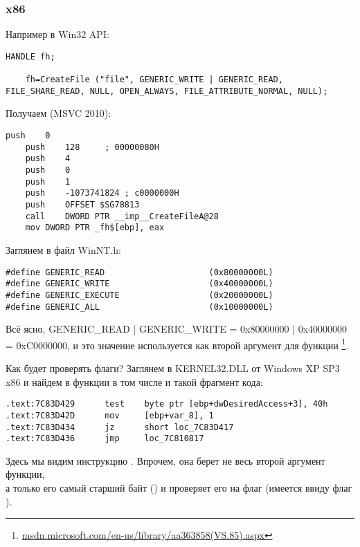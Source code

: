 \subsubsection{x86}

Например в Win32 API:

\begin{lstlisting}[style=customc]
	HANDLE fh;

	fh=CreateFile ("file", GENERIC_WRITE | GENERIC_READ, FILE_SHARE_READ, NULL, OPEN_ALWAYS, FILE_ATTRIBUTE_NORMAL, NULL);
\end{lstlisting}

Получаем (MSVC 2010):

\begin{lstlisting}[caption=MSVC 2010,style=customasmx86]
	push	0
	push	128		; 00000080H
	push	4
	push	0
	push	1
	push	-1073741824	; c0000000H
	push	OFFSET $SG78813
	call	DWORD PTR __imp__CreateFileA@28
	mov	DWORD PTR _fh$[ebp], eax
\end{lstlisting}

Заглянем в файл WinNT.h:

\begin{lstlisting}[caption=WinNT.h,style=customc]
#define GENERIC_READ                     (0x80000000L)
#define GENERIC_WRITE                    (0x40000000L)
#define GENERIC_EXECUTE                  (0x20000000L)
#define GENERIC_ALL                      (0x10000000L)
\end{lstlisting}

Всё ясно,
GENERIC\_READ | GENERIC\_WRITE = 0x80000000 | 0x40000000 = 0xC0000000,
и это значение используется как второй аргумент для функции
\footnote{\href{http://msdn.microsoft.com/en-us/library/aa363858(VS.85).aspx}{msdn.microsoft.com/en-us/library/aa363858(VS.85).aspx}}.

Как  будет проверять флаги?
Заглянем в KERNEL32.DLL от Windows XP SP3 x86 и найдем в функции  в том числе и 
такой фрагмент кода:

\begin{lstlisting}[caption=KERNEL32.DLL (Windows XP SP3 x86),style=customasmx86]
.text:7C83D429      test    byte ptr [ebp+dwDesiredAccess+3], 40h
.text:7C83D42D      mov     [ebp+var_8], 1
.text:7C83D434      jz      short loc_7C83D417
.text:7C83D436      jmp     loc_7C810817
\end{lstlisting}

Здесь мы видим инструкцию \TEST. Впрочем, она берет не весь второй аргумент функции,\\
а только его самый старший байт () и проверяет его на флаг 
(имеется ввиду флаг ).

